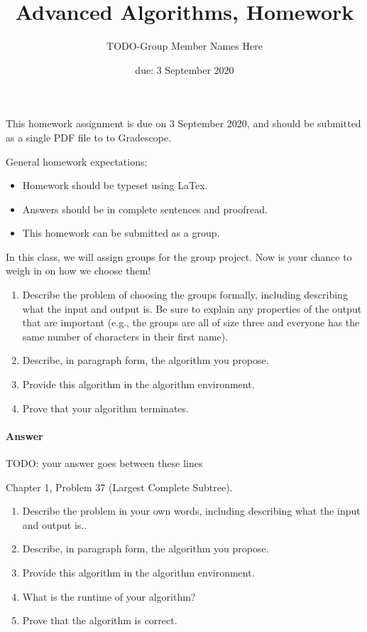 \documentclass{article}
\title{Advanced Algorithms, Homework \hwnum}
\author{TODO-Group Member Names Here}
\date{due: 3 September 2020}
\begin{document}
\maketitle

This homework assignment is due on 3 September 2020, and should be
submitted as a single PDF file to to Gradescope.

General homework expectations:
\begin{itemize}
    \item Homework should be typeset using LaTex.
    \item Answers should be in complete sentences and proofread.
    \item This homework can be submitted as a group.
\end{itemize}

\nextprob
{}

In this class, we will assign groups for the group project.  Now is your chance
to weigh in on how we choose them!
\begin{enumerate}
    \item Describe the problem of choosing the groups formally, including
        describing what the input and output is.  Be sure to explain any
        properties of the output that are important (e.g., the groups are all of
        size three and everyone has the same number of characters in their first
        name).
    \item Describe, in paragraph form, the algorithm you propose.
    \item Provide this algorithm in the algorithm environment.
    \item Prove that your algorithm terminates.
\end{enumerate}

\paragraph{Answer}


TODO: your answer goes between these lines


\nextprob
{}

Chapter 1, Problem 37 (Largest Complete Subtree).

\begin{enumerate}
    \item Describe the problem in your own words, including
        describing what the input and output is..
    \item Describe, in paragraph form, the algorithm you propose.
    \item Provide this algorithm in the algorithm environment.
    \item What is the runtime of your algorithm?
    \item Prove that the algorithm is correct.
\end{enumerate}
\end{document}
